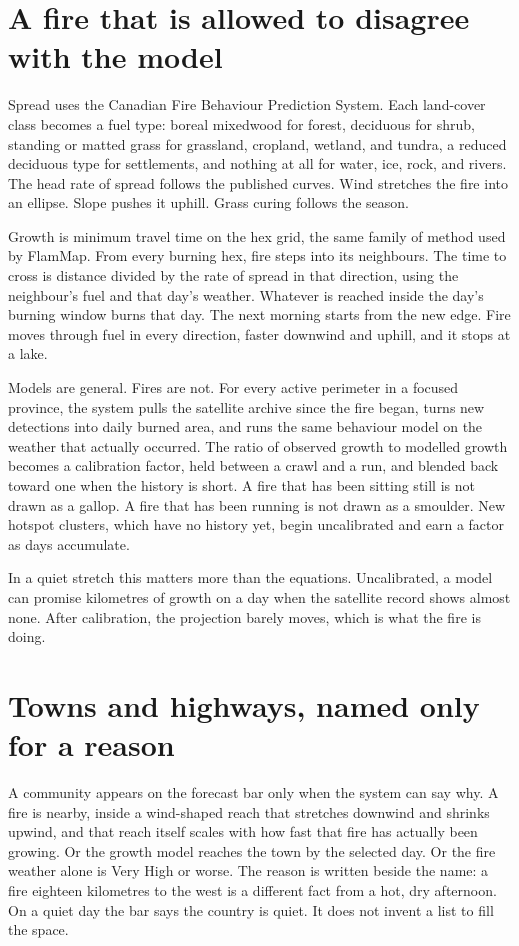 \documentclass[11pt,a4paper]{article}
\begin{document}
\section{A fire that is allowed to disagree with the model}

Spread uses the Canadian Fire Behaviour Prediction System. Each land-cover class becomes a fuel type: boreal mixedwood for forest, deciduous for shrub, standing or matted grass for grassland, cropland, wetland, and tundra, a reduced deciduous type for settlements, and nothing at all for water, ice, rock, and rivers. The head rate of spread follows the published curves. Wind stretches the fire into an ellipse. Slope pushes it uphill. Grass curing follows the season.

Growth is minimum travel time on the hex grid, the same family of method used by FlamMap. From every burning hex, fire steps into its neighbours. The time to cross is distance divided by the rate of spread in that direction, using the neighbour's fuel and that day's weather. Whatever is reached inside the day's burning window burns that day. The next morning starts from the new edge. Fire moves through fuel in every direction, faster downwind and uphill, and it stops at a lake.

Models are general. Fires are not. For every active perimeter in a focused province, the system pulls the satellite archive since the fire began, turns new detections into daily burned area, and runs the same behaviour model on the weather that actually occurred. The ratio of observed growth to modelled growth becomes a calibration factor, held between a crawl and a run, and blended back toward one when the history is short. A fire that has been sitting still is not drawn as a gallop. A fire that has been running is not drawn as a smoulder. New hotspot clusters, which have no history yet, begin uncalibrated and earn a factor as days accumulate.

In a quiet stretch this matters more than the equations. Uncalibrated, a model can promise kilometres of growth on a day when the satellite record shows almost none. After calibration, the projection barely moves, which is what the fire is doing.

\section{Towns and highways, named only for a reason}

A community appears on the forecast bar only when the system can say why. A fire is nearby, inside a wind-shaped reach that stretches downwind and shrinks upwind, and that reach itself scales with how fast that fire has actually been growing. Or the growth model reaches the town by the selected day. Or the fire weather alone is Very High or worse. The reason is written beside the name: a fire eighteen kilometres to the west is a different fact from a hot, dry afternoon. On a quiet day the bar says the country is quiet. It does not invent a list to fill the space.
\end{document}
